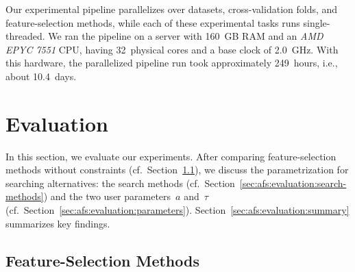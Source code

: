 \documentclass{article}
\theoremstyle{definition}
\begin{document}
Our experimental pipeline parallelizes over datasets, cross-validation folds, and feature-selection methods, while each of these experimental tasks runs single-threaded.
We ran the pipeline on a server with 160~GB RAM and an \emph{AMD EPYC 7551} CPU, having 32~physical cores and a base clock of 2.0~GHz.
With this hardware, the parallelized pipeline run took approximately 249~hours, i.e., about 10.4~days.

\section{Evaluation}
\label{sec:afs:evaluation}

In this section, we evaluate our experiments.
After comparing feature-selection methods without constraints (cf.~Section~\ref{sec:afs:evaluation:feature-selection}), we discuss the parametrization for searching alternatives: the search methods (cf.~Section~\ref{sec:afs:evaluation:search-methods}) and the two user parameters~$a$ and~$\tau$ (cf.~Section~\ref{sec:afs:evaluation:parameters}).
Section~\ref{sec:afs:evaluation:summary} summarizes key findings.

\subsection{Feature-Selection Methods}
\label{sec:afs:evaluation:feature-selection}
\end{document}
